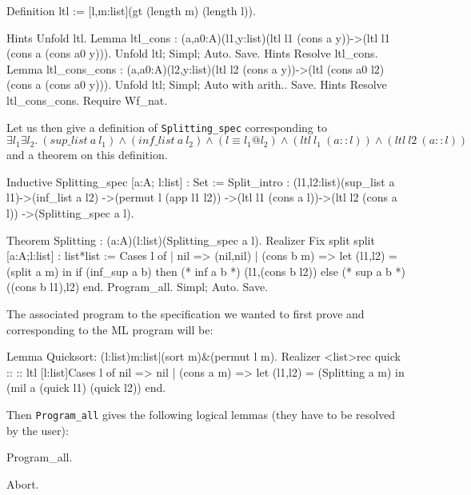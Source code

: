 \begin{coq_example*}
Definition ltl := [l,m:list](gt (length m) (length l)). 
\end{coq_example*}
\begin{coq_eval}
Hints Unfold ltl.
Lemma ltl_cons : (a,a0:A)(l1,y:list)(ltl l1 (cons a y))->(ltl l1 (cons a (cons a0 y))).
Unfold ltl; Simpl; Auto.
Save.
Hints Resolve ltl_cons.
Lemma ltl_cons_cons : (a,a0:A)(l2,y:list)(ltl l2 (cons a y))->(ltl (cons a0 l2) (cons a (cons a0 y))).
Unfold ltl; Simpl; Auto with arith..
Save.
Hints Resolve ltl_cons_cons.
Require Wf_nat.
\end{coq_eval}
Let us then give a definition of \verb=Splitting_spec= corresponding
to\\
$\exists l_1 \exists l_2.~(sup\_list~a~l_1) \wedge (inf\_list~a~l_2) 
\wedge (l \equiv l_1@l_2) \wedge (ltl~l_1~(a::l)) \wedge
(ltl~l2~(a::l))$ and a theorem on this definition.
\begin{coq_example*}
Inductive Splitting_spec [a:A; l:list] : Set :=
      Split_intro : (l1,l2:list)(sup_list a l1)->(inf_list a l2)
                    ->(permut l (app l1 l2))
                    ->(ltl l1 (cons a l))->(ltl l2 (cons a l))
                    ->(Splitting_spec a l).
\end{coq_example*}
\begin{coq_example*}
Theorem Splitting : (a:A)(l:list)(Splitting_spec a l).
Realizer 
  Fix split {split [a:A;l:list] : list*list := 
    Cases l of 
    | nil => (nil,nil)
    | (cons b m) => let (l1,l2) = (split a m) in
               if (inf_sup a b)
               then (* inf a b *) (l1,(cons b l2))
               else (* sup a b *) ((cons b l1),l2)
    end}.
Program_all.
Simpl; Auto.
Save.
\end{coq_example*}

The associated {\real} program to the specification we wanted to first
prove and corresponding to the ML program will be:
\begin{coq_example*}
Lemma Quicksort: (l:list){m:list|(sort m)&(permut l m)}.
Realizer <list>rec quick :: :: { ltl }
           [l:list]Cases l of 
              nil => nil
           | (cons a m) => let (l1,l2) = (Splitting a m) in
                                 (mil a (quick l1) (quick l2))
           end.
\end{coq_example*}
Then \verb=Program_all= gives the following logical lemmas (they have
to be resolved by the user):
\begin{coq_example}
Program_all.
\end{coq_example}
\begin{coq_eval}
Abort.
\end{coq_eval}

